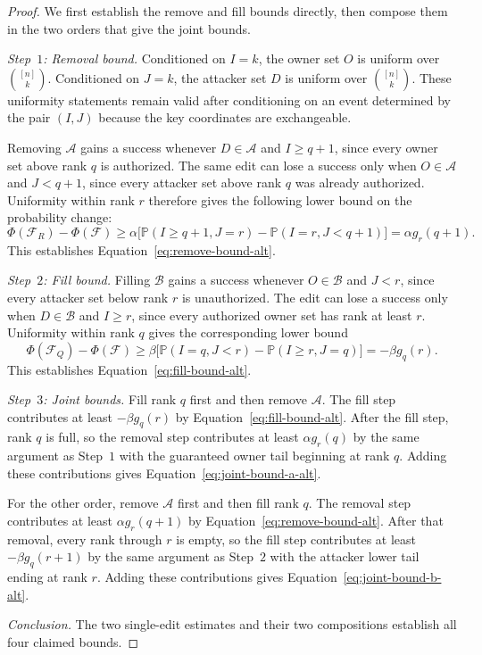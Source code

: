 \documentclass[11pt]{article}
\newcommand{\Prob}{\ensuremath{\mathbb P}\xspace}
\newcommand{\cF}{\ensuremath{\mathcal F}\xspace}
\newcommand{\cA}{\ensuremath{\mathcal A}\xspace}
\newcommand{\cB}{\ensuremath{\mathcal B}\xspace}
\begin{document}
\begin{proof}
We first establish the remove and fill bounds directly, then compose them in the two orders that give the joint bounds.

\emph{Step~$1$: Removal bound.}
Conditioned on ${I=k}$, the owner set $O$ is uniform over $\binom{[n]}k$.
Conditioned on ${J=k}$, the attacker set $D$ is uniform over $\binom{[n]}k$.
These uniformity statements remain valid after conditioning on an event determined by the pair $(I,J)$ because the key coordinates are exchangeable.

Removing $\cA$ gains a success whenever ${D\in\cA}$ and ${I\geq q+1}$, since every owner set above rank $q$ is authorized.
The same edit can lose a success only when ${O\in\cA}$ and ${J<q+1}$, since every attacker set above rank $q$ was already authorized.
Uniformity within rank $r$ therefore gives the following lower bound on the probability change:
\begin{equation*}
\Phi(\cF_R)-\Phi(\cF)
\geq
\alpha\bigl[\Prob(I\geq q+1,J=r)-\Prob(I=r,J<q+1)\bigr]
=\alpha g_r(q+1).
\end{equation*}
This establishes Equation~\eqref{eq:remove-bound-alt}.

\emph{Step~$2$: Fill bound.}
Filling $\cB$ gains a success whenever ${O\in\cB}$ and ${J<r}$, since every attacker set below rank $r$ is unauthorized.
The edit can lose a success only when ${D\in\cB}$ and ${I\geq r}$, since every authorized owner set has rank at least $r$.
Uniformity within rank $q$ gives the corresponding lower bound
\begin{equation*}
\Phi(\cF_Q)-\Phi(\cF)
\geq
\beta\bigl[\Prob(I=q,J<r)-\Prob(I\geq r,J=q)\bigr]
=-\beta g_q(r).
\end{equation*}
This establishes Equation~\eqref{eq:fill-bound-alt}.

\emph{Step~$3$: Joint bounds.}
Fill rank $q$ first and then remove $\cA$.
The fill step contributes at least $-\beta g_q(r)$ by Equation~\eqref{eq:fill-bound-alt}.
After the fill step, rank $q$ is full, so the removal step contributes at least $\alpha g_r(q)$ by the same argument as Step~$1$ with the guaranteed owner tail beginning at rank $q$.
Adding these contributions gives Equation~\eqref{eq:joint-bound-a-alt}.

For the other order, remove $\cA$ first and then fill rank $q$.
The removal step contributes at least $\alpha g_r(q+1)$ by Equation~\eqref{eq:remove-bound-alt}.
After that removal, every rank through $r$ is empty, so the fill step contributes at least $-\beta g_q(r+1)$ by the same argument as Step~$2$ with the attacker lower tail ending at rank $r$.
Adding these contributions gives Equation~\eqref{eq:joint-bound-b-alt}.

\emph{Conclusion.}
The two single-edit estimates and their two compositions establish all four claimed bounds.
\end{proof}
\end{document}

